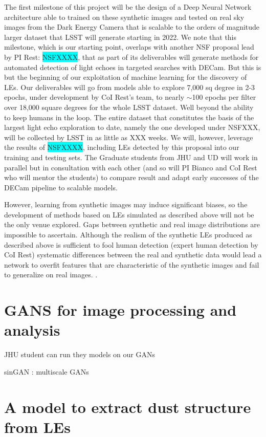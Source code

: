 \documentclass{proposalnsf}
\newcommand{\armin}[1]{\colorbox{cyan}{#1}}
\begin{document}
The first milestone of this project will be the design of a Deep Neural Network architecture able to trained on these synthetic images and tested on real sky images from the Dark Energy Camera that is scalable to the orders of magnitude larger dataset that LSST will generate starting in 2022. We note that this milestone, which is our starting point, overlaps with another NSF proposal lead by PI Rest: \armin{NSFXXXX}, that as part of its deliverables will generate methods for automated detection of light echoes in targeted searches with DECam. But this is but the beginning of our exploitation of machine learning for the discovery of LEs. Our deliverables will go from models able to explore 7,000 sq degree in 2-3 epochs, under development by CoI Rest's team, to nearly $\sim$100 epochs per filter over 18,000 square degrees for the whole LSST dataset. Well beyond the ability to keep humans in the loop. The entire dataset that constitutes the basis of the largest light echo exploration to date, namely the one developed under NSFXXX, will be collected by LSST in as little as XXX weeks.  
We will, however, leverage the results of \armin{NSFXXXX}, including LEs detected by this proposal into our training and testing sets. The Graduate students from JHU and UD will work in parallel but in consultation with each other (and so will PI Bianco and CoI Rest who will mentor the students) to compare result and adapt early successes of the DECam pipeline to scalable models.


However, learning from synthetic
images may induce significant biases, so the development of methods based on LEs simulated as described above will not be the only venue explored.  Gaps between synthetic and real image distributions are impossible to ascertain.  Although the realism of the synthetic LEs produced as described above is sufficient to fool human detection (expert human detection by CoI Rest) systematic differences between the real and synthetic data would lead a network to overfit features that are characteristic of the synthetic images and fail to
generalize on real images.  \citep{Shrivastava_2017_CVPR}.  


\section{GANS for image processing and analysis}

JHU student can run they models on our GANs

sinGAN : multiscale GANs


\section{A model to extract dust structure from LEs}
\end{document}
